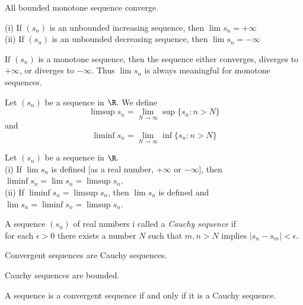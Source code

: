 \documentclass[twoside, 10pt]{article}
\begin{document}
\begin{thm}
All bounded monotone sequence converge.
\end{thm}

\begin{thm}
(i) If $(s_n)$ is an unbounded increasing sequence, then $\lim s_n = +\infty$\\
(ii) If $(s_n)$ is an unbounded decreasing sequence, then $\lim s_n = -\infty$
\end{thm}

\begin{cor}
If $(s_n)$ is a monotone sequence, then the sequence either converges, diverges to $+\infty$, or diverges to $-\infty$. Thus $\lim s_n$ is always meaningful for monotone sequences.
\end{cor}

\begin{defn}
Let $(s_n)$ be a sequence in $\R$. We define
$$ \limsup s_n = \lim_{N\to\infty} \sup\{s_n : n > N\} $$
and
$$ \liminf s_n = \lim_{N\to\infty} \inf\{s_n : n > N\} $$
\end{defn}

\begin{thm}
Let $(s_n)$ be a sequence in $\R$.\\
(i) If $\lim s_n$ is defined [as a real number, $+\infty$ or $-\infty$], then $\liminf s_n = \lim s_n = \limsup s_n$.\\
(ii) If $\liminf s_n = \limsup s_n$, then $\lim s_n$ is defined and $\lim s_n = \liminf s_n = \limsup s_n$.
\end{thm}

\begin{defn}
A sequence $(s_n)$ of real numbers i called a \emph{Cauchy sequence} if\\
for each $\epsilon > 0$ there exists a number $N$ such that $m,n>N$ implies $|s_n - s_m| < \epsilon$.
\end{defn}

\begin{lem}
Convergent sequences are Cauchy sequences.
\end{lem}

\begin{lem}
Cauchy sequences are bounded.
\end{lem}

\begin{thm}
A sequence is a convergent sequence if and only if it is a Cauchy sequence.
\end{thm}
\end{document}
